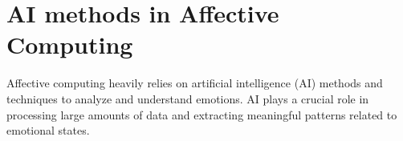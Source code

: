 \section{AI methods in Affective Computing}
Affective computing heavily relies on artificial intelligence (AI) methods and techniques to analyze and understand emotions. 
AI plays a crucial role in processing large amounts of data and extracting meaningful patterns related to emotional states. 





